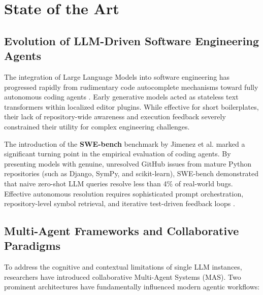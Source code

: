 \chapter{State of the Art}
\label{chap:state_of_the_art}

\section{Evolution of LLM-Driven Software Engineering Agents}
\label{sec:agent_evolution}

The integration of Large Language Models into software engineering has progressed rapidly from rudimentary code autocomplete mechanisms toward fully autonomous coding agents \cite{Jimenez2024SWEbench}. Early generative models acted as stateless text transformers within localized editor plugins. While effective for short boilerplates, their lack of repository-wide awareness and execution feedback severely constrained their utility for complex engineering challenges.

The introduction of the \textbf{SWE-bench} benchmark by Jimenez et al. \cite{Jimenez2024SWEbench} marked a significant turning point in the empirical evaluation of coding agents. By presenting models with genuine, unresolved GitHub issues from mature Python repositories (such as Django, SymPy, and scikit-learn), SWE-bench demonstrated that naive zero-shot LLM queries resolve less than 4\% of real-world bugs. Effective autonomous resolution requires sophisticated prompt orchestration, repository-level symbol retrieval, and iterative test-driven feedback loops \cite{Xia2024Agentless}.

\section{Multi-Agent Frameworks and Collaborative Paradigms}
\label{sec:multi_agent_frameworks}

To address the cognitive and contextual limitations of single LLM instances, researchers have introduced collaborative Multi-Agent Systems (MAS). Two prominent architectures have fundamentally influenced modern agentic workflows:

